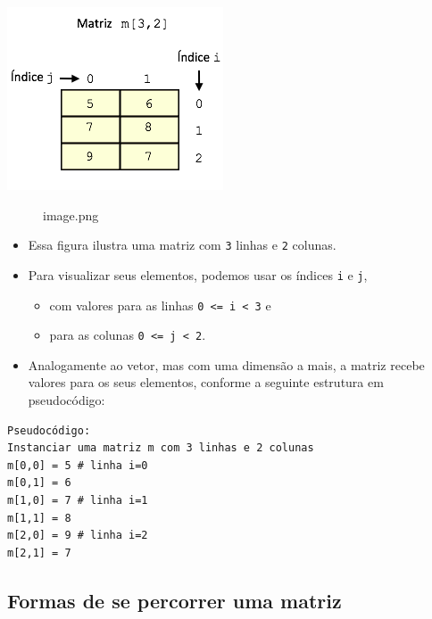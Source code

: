 \documentclass[12pt,a4paper]{article}
\providecommand{\tightlist}{%
      \setlength{\itemsep}{0pt}\setlength{\parskip}{0pt}}
\begin{document}
\includegraphics{"figs/image40.png"}

    \begin{figure}
\centering
\caption{image.png}
\end{figure}

    \begin{itemize}
\tightlist
\item
  Essa figura ilustra uma matriz com \texttt{3} linhas e \texttt{2}
  colunas.
\item
  Para visualizar seus elementos, podemos usar os índices \texttt{i} e
  \texttt{j},

  \begin{itemize}
  \tightlist
  \item
    com valores para as linhas
    \texttt{0\ \textless{}=\ i\ \textless{}\ 3} e
  \item
    para as colunas \texttt{0\ \textless{}=\ j\ \textless{}\ 2}.
  \end{itemize}
\item
  Analogamente ao vetor, mas com uma dimensão a mais, a matriz recebe
  valores para os seus elementos, conforme a seguinte estrutura em
  pseudocódigo:
\end{itemize}

    \begin{verbatim}
Pseudocódigo:
Instanciar uma matriz m com 3 linhas e 2 colunas
m[0,0] = 5 # linha i=0
m[0,1] = 6
m[1,0] = 7 # linha i=1
m[1,1] = 8
m[2,0] = 9 # linha i=2
m[2,1] = 7
\end{verbatim}

    \hypertarget{formas-de-se-percorrer-uma-matriz}{%
\subsection{Formas de se percorrer uma
matriz}\label{formas-de-se-percorrer-uma-matriz}}
\end{document}
